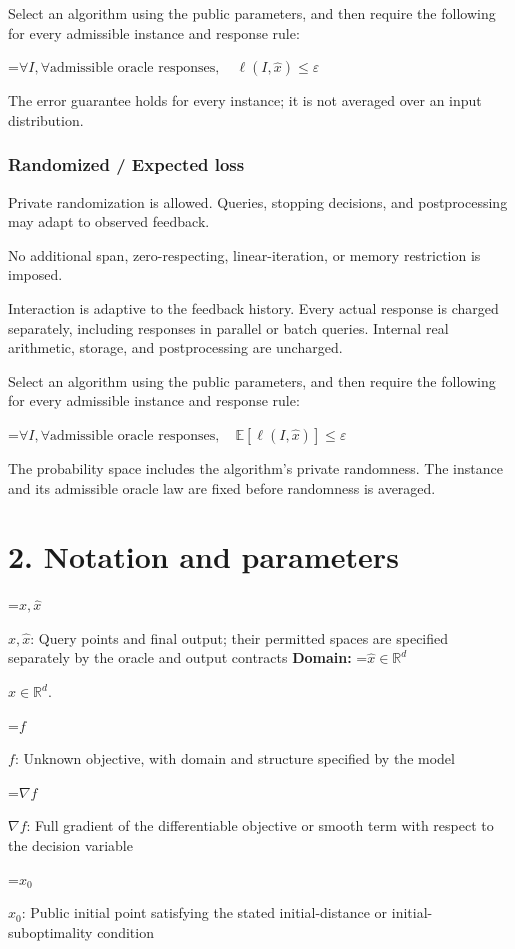 \documentclass[10pt,a4paper]{article}
\newcommand{\AtlasMath}[1]{\par\begingroup\centering\setbox0=\hbox{$\displaystyle #1$}\ifdim\wd0>1.4\linewidth\typeout{ATLAS WIDE FORMULA: \the\wd0}\fi\ifdim\wd0>\linewidth\resizebox{\linewidth}{!}{\box0}\else\box0\fi\par\endgroup}
\newcommand{\AtlasInlineMath}[1]{\begingroup\setbox0=\hbox{$#1$}\ifdim\wd0>.4\linewidth\endgroup\AtlasMath{#1}\else\endgroup$#1$\fi}
\begin{document}
Select an algorithm using the public parameters, and then require the following for every admissible instance and response rule:


\AtlasMath{\forall I,\forall\text{admissible oracle responses},\quad\ell(I,\widehat{x})\le\varepsilon}


The error guarantee holds for every instance; it is not averaged over an input distribution.

\subsubsection{Randomized / Expected loss}
Private randomization is allowed. Queries, stopping decisions, and postprocessing may adapt to observed feedback.

No additional span, zero-respecting, linear-iteration, or memory restriction is imposed.

Interaction is adaptive to the feedback history. Every actual response is charged separately, including responses in parallel or batch queries. Internal real arithmetic, storage, and postprocessing are uncharged.

Select an algorithm using the public parameters, and then require the following for every admissible instance and response rule:


\AtlasMath{\forall I,\forall\text{admissible oracle responses},\quad\mathbb{E}[\ell(I,\widehat{x})]\le\varepsilon}


The probability space includes the algorithm's private randomness. The instance and its admissible oracle law are fixed before randomness is averaged.

\section{2. Notation and parameters}
\AtlasInlineMath{x,\widehat{x}}: Query points and final output; their permitted spaces are specified separately by the oracle and output contracts \textbf{Domain:} \AtlasInlineMath{\widehat{x}\in \mathbb{R}^d}.

\AtlasInlineMath{f}: Unknown objective, with domain and structure specified by the model

\AtlasInlineMath{\nabla f}: Full gradient of the differentiable objective or smooth term with respect to the decision variable

\AtlasInlineMath{x_0}: Public initial point satisfying the stated initial-distance or initial-suboptimality condition
\end{document}
